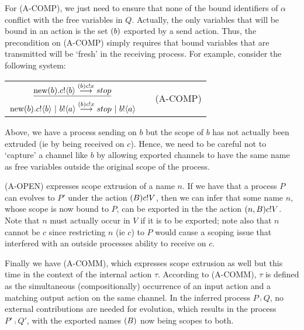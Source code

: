 For (A-COMP), we just need to ensure that none of the bound identifiers of $\alpha$ conflict with the free variables in $Q$.  Actually, the only variables that will be bound in an action is the set $({b})$ exported by a send action.  Thus, the precondition on (A-COMP) simply requires that bound variables that are transmitted will be `fresh' in the receiving process.  For example, consider the following system:
\begin{center}\begin{tabular}{rllll}
	\multicolumn{3}{c}{$\underline{\text{new}({b}).{c}!\langle{b}\rangle\overset{{({b}){c}!{x}}}{\longrightarrow} stop}$} & & \multirow{2}{*}{\tiny{(A-COMP)}}\\
	\multicolumn{3}{c}{$\text{new}({b}).{c}!\langle{b}\rangle \ |\  {b}!\langle{a}\rangle\overset{{({b}){c}!{x}}}{\longrightarrow} stop\ |\  {b}!\langle{a}\rangle$}\\[10pt]
\end{tabular}\end{center}
Above, we have a process sending on $b$ but the scope of $b$ has not actually been extruded (ie by being received on $c$).  Hence, we need to be careful not to `capture' a channel like $b$ by allowing exported channels to have the same name as free variables outside the original scope of the process.

(A-OPEN) expresses scope extrusion of a name $n$.  If we have that a process $P$ can evolves to $P'$ under the action $({B}){c}!{V}$, then we can infer that some name $n$, whose scope is now bound to $P$, can be exported in the the action $({n,B}){c}!{V}$.  Note that $n$ must actually occur in $V$ if it is to be exported; note also that $n$ cannot be $c$ since restricting $n$ (ie $c$) to $P$ would cause a scoping issue that interfered with an outside processes ability to receive on $c$.

Finally we have (A-COMM), which expresses scope extrusion as well but this time in the context of the internal action $\tau$.  According to (A-COMM), $\tau$ is defined as the simultaneous (compositionally) occurrence of an input action and a matching output action on the same channel.  In the inferred process $P\comp Q$, no external contributions are needed for evolution, which results in the process $P'\comp Q'$, with the exported names $({B})$ now being scopes to both.

